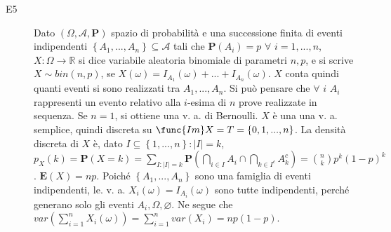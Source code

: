 \documentclass{article}
\begin{document}
\begin{description}
\item[E5] Dato $\left( \Omega ,\mathcal{A},\mathbf{P}\right) $ spazio di
probabilit\`{a} e una successione finita di eventi indipendenti $\left\{
A_{1},...,A_{n}\right\} \subseteq \mathcal{A}$ tali che $\mathbf{P}\left(
A_{i}\right) =p$ $\forall $ $i=1,...,n$, $X:\Omega \rightarrow 
\mathbb{R}
$ si dice variabile aleatoria binomiale di parametri $n,p$, e si scrive $%
X\sim bin\left( n,p\right) $, se $X\left( \omega \right) =I_{A_{1}}\left(
\omega \right) +...+I_{A_{n}}\left( \omega \right) $. $X$ conta quindi
quanti eventi si sono realizzati tra $A_{1},...,A_{n}$. Si pu\`{o} pensare
che $\forall $ $i$ $A_{i}$ rappresenti un evento relativo alla $i$-esima di $%
n$ prove realizzate in sequenza. Se $n=1$, si ottiene una v. a. di
Bernoulli. $X$ \`{e} una una v. a. semplice, quindi discreta su $\func{Im}%
X=T=\left\{ 0,1,...,n\right\} $. La densit\`{a} discreta di $X$ \`{e}, dato $%
I\subseteq \left\{ 1,...,n\right\} :\left\vert I\right\vert =k$, $%
p_{X}\left( k\right) =\mathbf{P}\left( X=k\right) =\sum_{I:\left\vert
I\right\vert =k}\mathbf{P}\left( \bigcap_{i\in I}A_{i}\cap \bigcap_{k\in
I^{c}}A_{k}^{c}\right) =\binom{n}{k}p^{k}\left( 1-p\right) ^{k}$. $\mathbf{E}%
\left( X\right) =np$. Poich\'{e} $\left\{ A_{1},...,A_{n}\right\} $ sono una
famiglia di eventi indipendenti, le. v. a. $X_{i}\left( \omega \right)
=I_{A_{i}}\left( \omega \right) $ sono tutte indipendenti, perch\'{e}
generano solo gli eventi $A_{i},\Omega ,\varnothing $. Ne segue che $%
var\left( \sum_{i=1}^{n}X_{i}\left( \omega \right) \right)
=\sum_{i=1}^{n}var\left( X_{i}\right) =np\left( 1-p\right) $.


\end{description}
\end{document}
